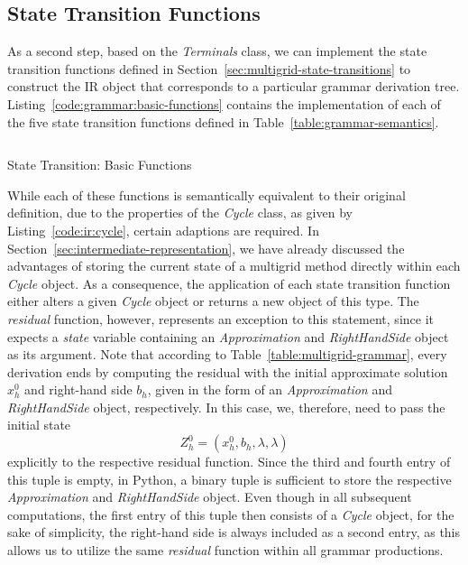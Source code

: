 \subsection{State Transition Functions}
\label{sec:evostencils:state-transition-functions}
As a second step, based on the \emph{Terminals} class, we can implement the state transition functions defined in Section~\ref{sec:multigrid-state-transitions} to construct the IR object that corresponds to a particular grammar derivation tree.
Listing~\ref{code:grammar:basic-functions} contains the implementation of each of the five state transition functions defined in Table~\ref{table:grammar-semantics}.
\begin{listing}
	\inputminted{python}{evostencils/grammar/base.py}
	\caption{State Transition: Basic Functions}
	\label{code:grammar:basic-functions}
\end{listing}
While each of these functions is semantically equivalent to their original definition, due to the properties of the \emph{Cycle} class, as given by Listing~\ref{code:ir:cycle}, certain adaptions are required.
In Section~\ref{sec:intermediate-representation}, we have already discussed the advantages of storing the current state of a multigrid method directly within each \emph{Cycle} object.
As a consequence, the application of each state transition function either alters a given \emph{Cycle} object or returns a new object of this type.
The \emph{residual} function, however, represents an exception to this statement, since it expects a \emph{state} variable containing an \emph{Approximation} and \emph{RightHandSide} object as its argument.
Note that according to Table~\ref{table:multigrid-grammar}, every derivation ends by computing the residual with the initial approximate solution $x_h^0$ and right-hand side $b_h$, given in the form of an \emph{Approximation} and \emph{RightHandSide} object, respectively.
In this case, we, therefore, need to pass the initial state 
\begin{equation*}
	Z_h^0 = (x_h^0, b_h, \lambda, \lambda)
\end{equation*} explicitly to the respective residual function.
Since the third and fourth entry of this tuple is empty, in Python, a binary tuple is sufficient to store the respective \emph{Approximation} and \emph{RightHandSide} object.
Even though in all subsequent computations, the first entry of this tuple then consists of a \emph{Cycle} object, for the sake of simplicity, the right-hand side is always included as a second entry, as this allows us to utilize the same \emph{residual} function within all grammar productions.
